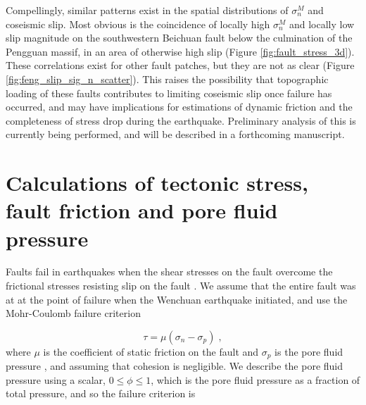 \documentclass[draft,jgrga]{AGUTeX}
\begin{document}
\begin{article}
Compellingly, similar patterns exist in the spatial distributions of
$\sigma^M_n$ and coseismic slip. Most obvious is the coincidence of
locally high $\sigma^M_n$ and locally low slip magnitude on the
southwestern Beichuan fault below the culmination of the Pengguan
massif, in an area of otherwise high slip (Figure
\ref{fig:fault_stress_3d}). These correlations exist for other fault
patches, but they are not as clear (Figure
\ref{fig:feng_slip_sig_n_scatter}). This raises the possibility that
topographic loading of these faults contributes to limiting coseismic
slip once failure has occurred, and
may have implications for estimations of dynamic friction and the
completeness of stress drop during the earthquake. Preliminary analysis
of this is currently being performed, and will be described in a
forthcoming manuscript.


\section{Calculations of tectonic stress, fault friction and pore fluid
pressure}\label{calculations-of-tectonic-stress-fault-friction-and-pore-fluid-pressure}

Faults fail in earthquakes when the shear stresses on the fault overcome
the frictional stresses resisting slip on the fault \citep[e.g.,][]
{scholz2002}. We assume that the entire fault was at at the point of
failure when the Wenchuan earthquake initiated, and use the Mohr-Coulomb
failure criterion

\begin{equation} 
\tau = \mu ( \sigma_n - \sigma_p ) \; ,
\label{eqn:amonton_raw} 
\end{equation}
where $\mu$ is the coefficient of static friction on the fault and
$\sigma_p$ is the pore fluid pressure \citep[e.g.,][]{sibson1985}, and
assuming that cohesion is negligible. We
describe the pore fluid pressure using a scalar, $0 \leq \phi \leq 1$,
which is the pore fluid pressure as a fraction of total pressure, and so
the failure criterion is


\end{article}
\end{document}
